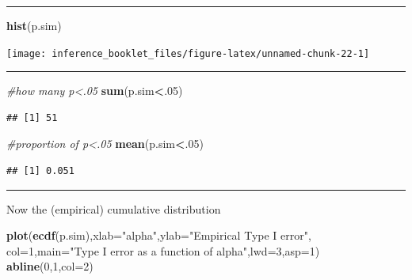 \documentclass[]{article}
\newenvironment{Shaded}{\begin{snugshade}}{\end{snugshade}}
\newcommand{\KeywordTok}[1]{\textcolor[rgb]{0.13,0.29,0.53}{\textbf{#1}}}
\newcommand{\DataTypeTok}[1]{\textcolor[rgb]{0.13,0.29,0.53}{#1}}
\newcommand{\DecValTok}[1]{\textcolor[rgb]{0.00,0.00,0.81}{#1}}
\newcommand{\StringTok}[1]{\textcolor[rgb]{0.31,0.60,0.02}{#1}}
\newcommand{\CommentTok}[1]{\textcolor[rgb]{0.56,0.35,0.01}{\textit{#1}}}
\newcommand{\OperatorTok}[1]{\textcolor[rgb]{0.81,0.36,0.00}{\textbf{#1}}}
\newcommand{\NormalTok}[1]{#1}
\begin{document}
\begin{center}\rule{0.5\linewidth}{\linethickness}\end{center}

\begin{Shaded}
\begin{Highlighting}[]
\KeywordTok{hist}\NormalTok{(p.sim)}
\end{Highlighting}
\end{Shaded}

\begin{center}\texttt{[image: inference\_booklet\_files/figure-latex/unnamed-chunk-22-1]} \end{center}

\begin{center}\rule{0.5\linewidth}{\linethickness}\end{center}

\begin{Shaded}
\begin{Highlighting}[]
\CommentTok{#how many p<.05}
\KeywordTok{sum}\NormalTok{(p.sim}\OperatorTok{<}\NormalTok{.}\DecValTok{05}\NormalTok{)}
\end{Highlighting}
\end{Shaded}

\begin{verbatim}
## [1] 51
\end{verbatim}

\begin{Shaded}
\begin{Highlighting}[]
\CommentTok{#proportion of p<.05}
\KeywordTok{mean}\NormalTok{(p.sim}\OperatorTok{<}\NormalTok{.}\DecValTok{05}\NormalTok{)}
\end{Highlighting}
\end{Shaded}

\begin{verbatim}
## [1] 0.051
\end{verbatim}

\begin{center}\rule{0.5\linewidth}{\linethickness}\end{center}

Now the (empirical) cumulative distribution

\begin{Shaded}
\begin{Highlighting}[]
\KeywordTok{plot}\NormalTok{(}\KeywordTok{ecdf}\NormalTok{(p.sim),}\DataTypeTok{xlab=}\StringTok{"alpha"}\NormalTok{,}\DataTypeTok{ylab=}\StringTok{"Empirical Type I error"}\NormalTok{, }\DataTypeTok{col=}\DecValTok{1}\NormalTok{,}\DataTypeTok{main=}\StringTok{"Type I error as a function of alpha"}\NormalTok{,}\DataTypeTok{lwd=}\DecValTok{3}\NormalTok{,}\DataTypeTok{asp=}\DecValTok{1}\NormalTok{)}
\KeywordTok{abline}\NormalTok{(}\DecValTok{0}\NormalTok{,}\DecValTok{1}\NormalTok{,}\DataTypeTok{col=}\DecValTok{2}\NormalTok{)}
\end{Highlighting}
\end{Shaded}
\end{document}
